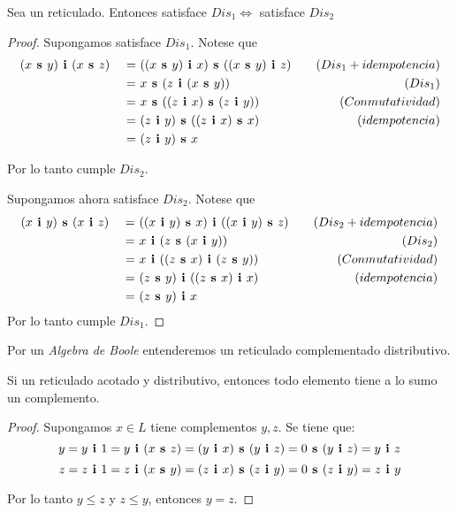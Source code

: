 \begin{lemma}
  Sea \reticulAlg un reticulado. Entonces \reticulAlg satisface $Dis_1 \iff$ \reticulAlg satisface $Dis_2$
\end{lemma}
\begin{proof}
  Supongamos \reticulAlg satisface $Dis_1$. Notese que
  \begin{alignat*}{3}
    &\infbin{(\supbin{x}{y})}{(\supbin{x}{z})} &\ =&\ \supbin{(\infbin{(\supbin{x}{y})}{x})}{(\infbin{(\supbin{x}{y})}{z})} &\quad(Dis_1 + idempotencia)\\
    & &\ =&\ \supbin{x}{(\infbin{z}{(\supbin{x}{y})})} &\quad (Dis_1)\\
    & &\ =&\ \supbin{x}{(\supbin{(\infbin{z}{x})}{(\infbin{z}{y})})}&\quad (Conmutatividad)\\
    & &\ =&\ \supbin{(\infbin{z}{y})}{(\supbin{(\infbin{z}{x})}{x})}&\quad (idempotencia)\\
    & &\ =&\ \supbin{(\infbin{z}{y})}{x}
  \end{alignat*}
  
  Por lo tanto cumple $Dis_2$.
  
  Supongamos ahora \reticulAlg satisface $Dis_2$. Notese que
  \begin{alignat*}{3}
    &\supbin{(\infbin{x}{y})}{(\infbin{x}{z})} &\ =&\ \infbin{(\supbin{(\infbin{x}{y})}{x})}{(\supbin{(\infbin{x}{y})}{z})} &\quad(Dis_2 + idempotencia)\\
    & &\ =&\ \infbin{x}{(\supbin{z}{(\infbin{x}{y})})} &\quad (Dis_2)\\
    & &\ =&\ \infbin{x}{(\infbin{(\supbin{z}{x})}{(\supbin{z}{y})})}&\quad (Conmutatividad)\\
    & &\ =&\ \infbin{(\supbin{z}{y})}{(\infbin{(\supbin{z}{x})}{x})}&\quad (idempotencia)\\
    & &\ =&\ \infbin{(\supbin{z}{y})}{x}
  \end{alignat*}
  Por lo tanto cumple $Dis_1$.
\end{proof}

\begin{definition}
  Por un \emph{Algebra de Boole} entenderemos un reticulado complementado distributivo.
\end{definition}

\begin{lemma}
  Si \reticulAcot un reticulado acotado y distributivo, entonces todo elemento tiene a lo sumo un complemento.
\end{lemma}
\begin{proof}
  Supongamos $x \in L$ tiene complementos $y, z$. Se tiene que:
  $$
  y = y\textbf{ i }1 = y\textbf{ i }(x\textbf{ s }z) = (y\textbf{ i }x)\textbf{ s }(y\textbf{ i }z) = 0\textbf{ s }(y\textbf{ i }z) = y\textbf{ i }z
  $$
  $$
  z = z\textbf{ i }1 = z\textbf{ i }(x\textbf{ s }y) = (z\textbf{ i }x)\textbf{ s }(z\textbf{ i }y) = 0\textbf{ s }(z\textbf{ i }y) = z\textbf{ i }y 
  $$

  Por lo tanto $y \leq z$ y $z \leq y$, entonces $y = z$.
\end{proof}

